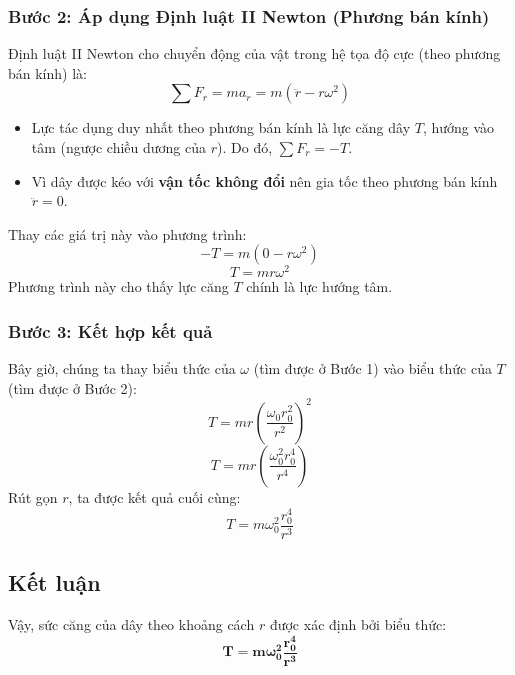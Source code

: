 \documentclass[12pt, a4paper]{article}
\begin{document}
\subsubsection*{Bước 2: Áp dụng Định luật II Newton (Phương bán kính)}
Định luật II Newton cho chuyển động của vật trong hệ tọa độ cực (theo phương bán kính) là:
$$ \sum F_r = m a_r = m (\ddot{r} - r\omega^2) $$
\begin{itemize}
	\item Lực tác dụng duy nhất theo phương bán kính là lực căng dây $T$, hướng vào tâm (ngược chiều dương của $r$). Do đó, $\sum F_r = -T$.
	\item Vì dây được kéo với \textbf{vận tốc không đổi} nên gia tốc theo phương bán kính $\ddot{r} = 0$.
\end{itemize}
Thay các giá trị này vào phương trình:
$$ -T = m (0 - r\omega^2) $$
$$ T = m r \omega^2 $$
Phương trình này cho thấy lực căng $T$ chính là lực hướng tâm.

\subsubsection*{Bước 3: Kết hợp kết quả}
Bây giờ, chúng ta thay biểu thức của $\omega$ (tìm được ở Bước 1) vào biểu thức của $T$ (tìm được ở Bước 2):
$$ T = m r \left( \frac{\omega_0 r_0^2}{r^2} \right)^2 $$
$$ T = m r \left( \frac{\omega_0^2 r_0^4}{r^4} \right) $$
Rút gọn $r$, ta được kết quả cuối cùng:
$$ T = m \omega_0^2 \frac{r_0^4}{r^3} $$

\subsection*{Kết luận}
Vậy, sức căng của dây theo khoảng cách $r$ được xác định bởi biểu thức:
$$ \mathbf{T = m \omega_0^2 \frac{r_0^4}{r^3}} $$
\end{document}
